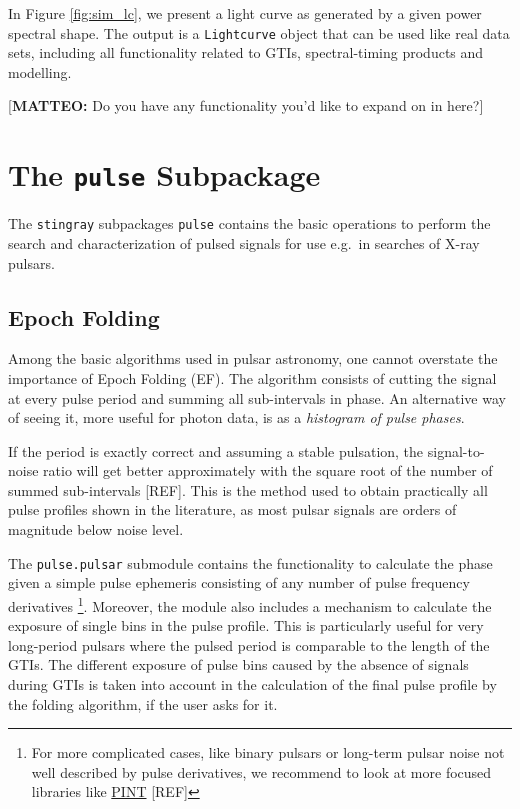 \documentclass[twocolumn]{aastex62}
\newcommand{\stingray}{\texttt{stingray}\xspace}
\begin{document}
In Figure \ref{fig:sim_lc}, we present a light curve as generated by a given power spectral shape. The output is a \texttt{Lightcurve} object that can be used like real data sets, including all functionality related to GTIs, spectral-timing products and modelling. 

[\textbf{MATTEO:} Do you have any functionality you'd like to expand on in here?]


\section{The \texttt{pulse} Subpackage}
\label{sec:pulsar}
The \stingray subpackages \texttt{pulse} contains the basic operations to perform the search and characterization of pulsed signals for use e.g.\ in searches of X-ray pulsars.

\subsection{Epoch Folding}
Among the basic algorithms used in pulsar astronomy, one cannot overstate the importance of Epoch Folding (EF).
The algorithm consists of cutting the signal at every pulse period and summing all sub-intervals in phase. 
An alternative way of seeing it, more useful for photon data, is as a \textit {histogram of pulse phases}.

If the period is exactly correct and assuming a stable pulsation, the signal-to-noise ratio will get better approximately with the square root of the number of summed sub-intervals [REF].
This is the method used to obtain practically all pulse profiles shown in the literature, as most pulsar signals are orders of magnitude below noise level.

The \texttt{pulse.pulsar} submodule contains the functionality to calculate the phase given a simple pulse ephemeris consisting of any number of pulse frequency derivatives%
\footnote{For more complicated cases, like binary pulsars or long-term pulsar noise not well described by pulse derivatives, we recommend to look at more focused libraries like \href{https://github.com/nanograv/PINT}{PINT} [REF]}.
Moreover, the module also includes a mechanism to calculate the exposure of single bins in the pulse profile. 
This is particularly useful for very long-period pulsars where the pulsed period is comparable to the length of the GTIs.
The different exposure of pulse bins caused by the absence of signals during GTIs is taken into account in the calculation of the final pulse profile by the folding algorithm, if the user asks for it. 
\end{document}
